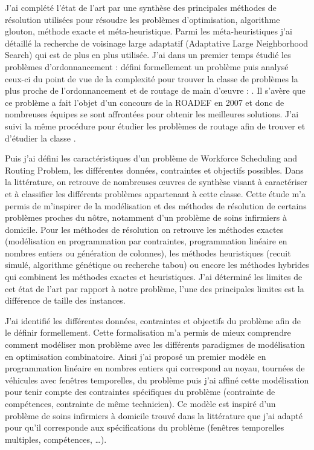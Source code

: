 \documentclass[]{report}
\begin{document}

J'ai complété l'état de l'art par une synthèse des principales méthodes de résolution utilisées pour résoudre les problèmes d'optimisation, algorithme glouton, méthode exacte et méta-heuristique.
Parmi les méta-heuristiques j'ai détaillé la recherche de voisinage large adaptatif (Adaptative Large Neighborhood Search) qui est de plus en plus utilisée.
J'ai dans un premier temps étudié les problèmes d'ordonnancement : défini formellement un problème  puis analysé ceux-ci du point de vue  de la complexité  pour trouver la classe de problèmes la plus proche de l'ordonnancement et de routage de main d'\oe uvre : \ttsp.
Il s'avère que ce problème a fait l'objet d'un concours de la ROADEF en 2007 et donc de nombreuses équipes se sont affrontées pour obtenir les meilleures solutions.
J'ai suivi la même procédure pour étudier les problèmes de routage afin de trouver et d'étudier la classe \vrptw.

Puis j'ai défini les caractéristiques d'un problème de Workforce Scheduling and Routing Problem, les différentes données, contraintes et objectifs possibles.
Dans la littérature, on retrouve de nombreuses \oe uvres de synthèse visant à caractériser et à classifier les différents problèmes appartenant à cette classe.
Cette étude m'a permis de m'inspirer de la modélisation et des méthodes de résolution de certains problèmes proches du nôtre, notamment d'un problème de soins infirmiers à domicile.
Pour les méthodes de résolution on retrouve les méthodes exactes (modélisation en programmation par contraintes,  programmation linéaire en nombres entiers ou génération de colonnes), les méthodes heuristiques (recuit simulé, algorithme génétique ou recherche tabou) ou encore les méthodes hybrides qui combinent les méthodes exactes et heuristiques.
J'ai déterminé les limites de cet état de l'art par rapport à notre problème, l'une des principales limites est la différence de taille des instances.


J'ai identifié les différentes données, contraintes et objectifs du problème afin de le définir formellement.
Cette formalisation m'a permis de mieux comprendre comment modéliser mon problème avec les différents paradigmes de modélisation en optimisation combinatoire.
Ainsi j'ai proposé un premier modèle en programmation linéaire en nombres entiers qui correspond au noyau, tournées de véhicules avec fenêtres temporelles, du problème puis j'ai affiné cette modélisation pour tenir compte des contraintes spécifiques du problème (contrainte de compétences, contrainte de même technicien).
Ce modèle est inspiré d'un problème de soins infirmiers à domicile trouvé dans la littérature que j'ai adapté pour qu'il corresponde aux spécifications du problème (fenêtres temporelles multiples, compétences, \ldots).
\end{document}
